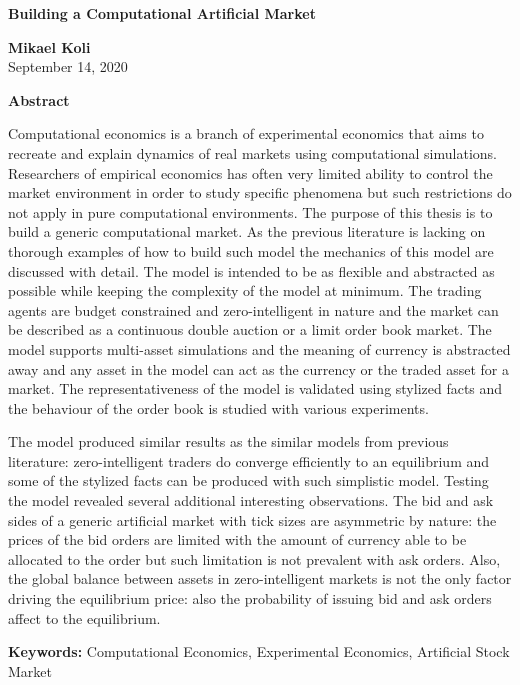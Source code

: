 \thispagestyle{plain}
\begin{center}
    \Large
    \textbf{Building a Computational Artificial Market}
        
    \vspace{0.4cm}
    \large
        
    \vspace{0.4cm}
    \textbf{Mikael Koli} \\
    September 14, 2020 %
       
    \vspace{0.9cm}
    \textbf{Abstract}
\end{center}

Computational economics is a branch of experimental economics that aims to 
recreate and explain dynamics of real markets using computational simulations. Researchers of
empirical economics has often very limited ability to control the market environment 
in order to study specific phenomena but such restrictions do not apply in pure computational
environments. The purpose of this thesis is to build a generic computational market. As the
previous literature is lacking on thorough examples of how to build such model the mechanics of this
model are discussed with detail. The model is intended to be as flexible and abstracted as possible 
while keeping the complexity of the model at minimum. The trading agents are budget constrained 
and zero-intelligent in nature and the market can be described as a continuous double auction or a 
limit order book market. The model supports multi-asset simulations and the meaning of currency is 
abstracted away and any asset in the model can act as the currency or the traded asset for a market. 
The representativeness of the model is validated using stylized facts and the behaviour
of the order book is studied with various experiments.

The model produced similar results as the similar models from previous literature: zero-intelligent
traders do converge efficiently to an equilibrium and some of the stylized facts can be produced
with such simplistic model. Testing the model revealed several additional interesting observations.
The bid and ask sides of a generic artificial market with tick sizes are asymmetric by nature: the 
prices of the bid orders are limited with the amount of currency able to be allocated to the order 
but such limitation is not prevalent with ask orders. Also, the global balance between assets in 
zero-intelligent markets is not the only factor driving the equilibrium price: also the probability 
of issuing bid and ask orders affect to the equilibrium.

\textbf{Keywords:} Computational Economics, Experimental Economics, Artificial Stock Market